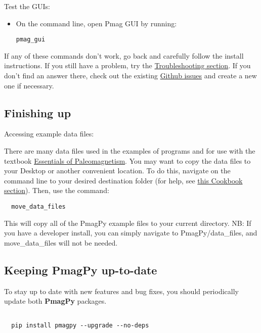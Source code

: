 \documentclass[11pt]{article}
\begin{document}
Test the GUIs:

\begin{itemize}
\item  On the command line, open Pmag GUI by running:

\begin{verbatim}
pmag_gui
\end{verbatim}

\end{itemize}

If any of these commands don't work, go back and carefully follow the install instructions.  If you still have a problem, try the \href{https://earthref.org/PmagPy/cookbook/#trouble}{Troubleshooting section}.  If you don't find an answer there, check out the existing \href{https://github.com/PmagPy/PmagPy/issues}{Github issues} and create a new one if necessary.

\subsection{Finishing up}

Accessing example data files:

   There are many data files used in the examples of programs and for use with the textbook  \href{http://earthref.org/MAGIC/books/Tauxe/Essentials/WebBook3.html}{Essentials of Paleomagnetism}.     You may want to copy  the data files to your Desktop or another convenient location.
   To do this, navigate on the command line to your desired destination folder (for help, see \href{https://earthref.org/PmagPy/cookbook/#file_system}{this Cookbook section}).  Then, use the command:

\begin{verbatim}
  move_data_files
\end{verbatim}

This will copy all of the PmagPy example files to your current directory.  NB: If you have a developer install, you can simply navigate to PmagPy/data\_files, and move\_data\_files will not be needed.


\subsection{Keeping PmagPy up-to-date}


To stay up to date with new features and bug fixes, you should periodically update both {\bf PmagPy} packages.
\begin{verbatim}

  pip install pmagpy --upgrade --no-deps
\end{verbatim}
\end{document}
